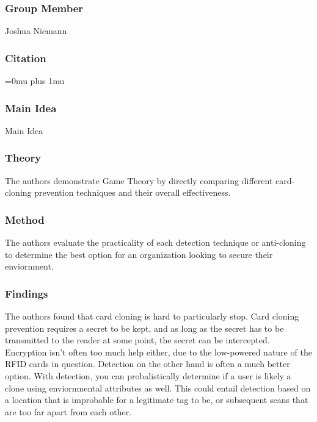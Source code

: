 \subsubsection{Group Member}

\noindent
Joshua Niemann

\noindent
\subsubsection{Citation}

\Urlmuskip=0mu plus 1mu\relax

\subsubsection{Main Idea}

\noindent
Main Idea

\subsubsection{Theory}

\noindent
 The authors demonstrate Game Theory by directly comparing different card-cloning prevention techniques and their overall effectiveness.

\subsubsection{Method}

\noindent
 The authors evaluate the practicality of each detection technique or anti-cloning to determine the best option for an organization looking to secure their enviornment.

\subsubsection{Findings}

\noindent
 The authors found that card cloning is hard to particularly stop.  Card cloning prevention requires a secret to be kept, and as long as the secret has to be transmitted to the reader at some point, the secret can be intercepted.  Encryption isn't often too much help either, due to the low-powered nature of the RFID cards in question.  Detection on the other hand is often a much better option.  With detection, you can probalistically determine if a user is likely a clone using enviornmental attributes as well.  This could entail detection based on a location that is improbable for a legitimate tag to be, or subsequent scans that are too far apart from each other.

